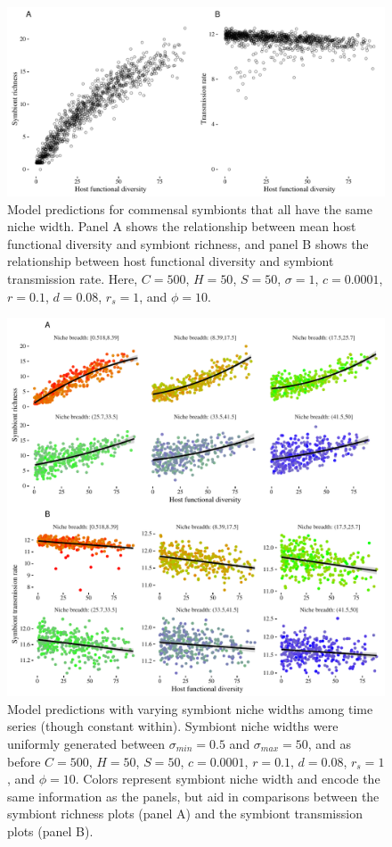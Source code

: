 \documentclass[12pt]{article}
\begin{document}
\newpage

\begin{figure}[ht]\centering
\includegraphics[width=\linewidth]{fig/fig1.pdf}
\caption{Model predictions for commensal symbionts that all have the same niche width. Panel A shows the relationship between mean host functional diversity and symbiont richness, and panel B shows the relationship between host functional diversity and symbiont transmission rate. Here, $C=500$, $H=50$, $S=50$, $\sigma = 1$, $c=0.0001$, $r=0.1$, $d=0.08$, $r_s=1$, and $\phi = 10$.}
\label{f2}
\end{figure}

\newpage

\begin{figure}[ht]\centering
\includegraphics[width=\linewidth]{fig/fig2.pdf}
\caption{Model predictions with varying symbiont niche widths among time series (though constant within). Symbiont niche widths were uniformly generated between $\sigma_{min} = 0.5$ and $\sigma_{max} = 50$, and as before $C=500$, $H=50$, $S=50$, $c=0.0001$, $r=0.1$, $d=0.08$, $r_s=1$, and $\phi = 10$. Colors represent symbiont niche width and encode the same information as the panels, but aid in comparisons between the symbiont richness plots (panel A) and the symbiont transmission plots (panel B).}
\label{f3}
\end{figure}
\end{document}
